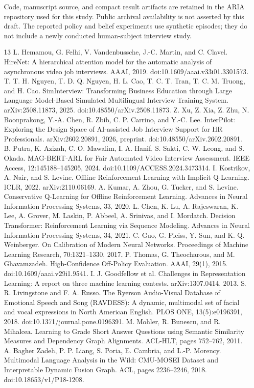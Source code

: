 \documentclass[10pt,a4paper]{article}
\begin{document}
Code, manuscript source, and compact result artifacts are retained in the ARIA repository used for this study. Public archival availability is not asserted by this draft. The reported policy and belief experiments use synthetic episodes; they do not include a newly conducted human-subject interview study.

\begin{thebibliography}{13}
 L. Hemamou, G. Felhi, V. Vandenbussche, J.-C. Martin, and C. Clavel. HireNet: A hierarchical attention model for the automatic analysis of asynchronous video job interviews. AAAI, 2019. doi:10.1609/aaai.v33i01.3301573.
 T. T. H. Nguyen, T. D. Q. Nguyen, H. L. Cao, T. C. T. Tran, T. C. M. Truong, and H. Cao. SimInterview: Transforming Business Education through Large Language Model-Based Simulated Multilingual Interview Training System. arXiv:2508.11873, 2025. doi:10.48550/arXiv.2508.11873.
 Z. Xu, Z. Xia, Z. Zhu, N. Boonprakong, Y.-A. Chen, R. Zbib, C. P. Carrino, and Y.-C. Lee. InterPilot: Exploring the Design Space of AI-assisted Job Interview Support for HR Professionals. arXiv:2602.20891, 2026, preprint. doi:10.48550/arXiv.2602.20891.
 B. Putra, K. Azizah, C. O. Mawalim, I. A. Hanif, S. Sakti, C. W. Leong, and S. Okada. MAG-BERT-ARL for Fair Automated Video Interview Assessment. IEEE Access, 12:145188--145205, 2024. doi:10.1109/ACCESS.2024.3473314.
 I. Kostrikov, A. Nair, and S. Levine. Offline Reinforcement Learning with Implicit Q-Learning. ICLR, 2022. arXiv:2110.06169.
 A. Kumar, A. Zhou, G. Tucker, and S. Levine. Conservative Q-Learning for Offline Reinforcement Learning. Advances in Neural Information Processing Systems, 33, 2020.
 L. Chen, K. Lu, A. Rajeswaran, K. Lee, A. Grover, M. Laskin, P. Abbeel, A. Srinivas, and I. Mordatch. Decision Transformer: Reinforcement Learning via Sequence Modeling. Advances in Neural Information Processing Systems, 34, 2021.
 C. Guo, G. Pleiss, Y. Sun, and K. Q. Weinberger. On Calibration of Modern Neural Networks. Proceedings of Machine Learning Research, 70:1321--1330, 2017.
 P. Thomas, G. Theocharous, and M. Ghavamzadeh. High-Confidence Off-Policy Evaluation. AAAI, 29(1), 2015. doi:10.1609/aaai.v29i1.9541.
 I. J. Goodfellow et al. Challenges in Representation Learning: A report on three machine learning contests. arXiv:1307.0414, 2013.
 S. R. Livingstone and F. A. Russo. The Ryerson Audio-Visual Database of Emotional Speech and Song (RAVDESS): A dynamic, multimodal set of facial and vocal expressions in North American English. PLOS ONE, 13(5):e0196391, 2018. doi:10.1371/journal.pone.0196391.
 M. Mohler, R. Bunescu, and R. Mihalcea. Learning to Grade Short Answer Questions using Semantic Similarity Measures and Dependency Graph Alignments. ACL-HLT, pages 752--762, 2011.
 A. Bagher Zadeh, P. P. Liang, S. Poria, E. Cambria, and L.-P. Morency. Multimodal Language Analysis in the Wild: CMU-MOSEI Dataset and Interpretable Dynamic Fusion Graph. ACL, pages 2236--2246, 2018. doi:10.18653/v1/P18-1208.
\end{thebibliography}
\end{document}
